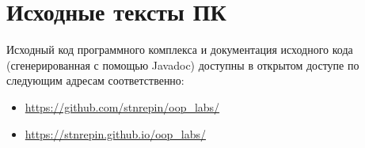 \section{Исходные тексты ПК}

\newcommand\SrcUrl{\url{https://github.com/stnrepin/oop_labs/}}
\newcommand\DocUrl{\url{https://stnrepin.github.io/oop_labs/}}

Исходный код программного комплекса и документация исходного кода
(сгенерированная с помощью Javadoc) доступны в открытом доступе по следующим
адресам соответственно:
\begin{itemize}
    \item \SrcUrl
    \item \DocUrl
\end{itemize}


\clearpage

